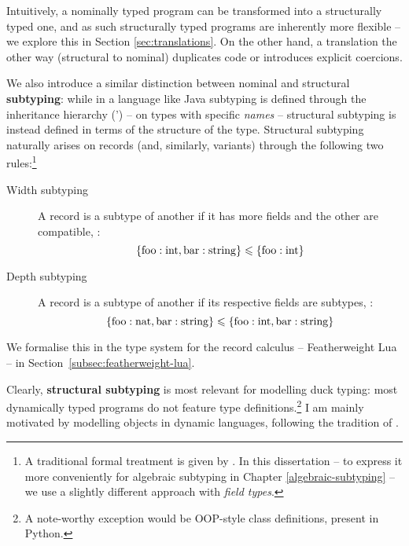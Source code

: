 Intuitively, a nominally typed program can be transformed into a structurally typed one, and as such structurally typed programs are inherently more flexible -- we explore this in Section \ref{sec:translations}. On the other hand, a translation the other way (structural to nominal) duplicates code or introduces explicit coercions.

We also introduce a similar distinction between nominal and structural \textbf{subtyping}: while in a language like Java subtyping is defined through the inheritance hierarchy (') -- on types with specific \emph{names} -- structural subtyping is instead defined in terms of the structure of the type. Structural subtyping naturally arises on records (and, similarly, variants) through the following two rules:\footnote{A traditional formal treatment is given by \textcite{tapl}. In this dissertation -- to express it more conveniently for algebraic subtyping in Chapter \ref{algebraic-subtyping} -- we use a slightly different approach with \emph{field types}.}
\begin{description}
    \item[Width subtyping] A record is a subtype of another if it has more fields and the other are compatible, \eg{}: $$ \{ \mathrm{foo} : \mathrm{int}, \mathrm{bar} : \mathrm{string} \} \leqslant \{ \mathrm{foo} : \mathrm{int} \} $$
    \item[Depth subtyping] A record is a subtype of another if its respective fields are subtypes, \eg{}:
    $$ \{ \mathrm{foo}: \mathrm{nat}, \mathrm{bar}: \mathrm{string} \} \leqslant \{ \mathrm{foo}: \mathrm{int}, \mathrm{bar}: \mathrm{string} \} $$
\end{description}

We formalise this in the type system for the record calculus -- Featherweight Lua -- in Section~\ref{subsec:featherweight-lua}.

Clearly, \textbf{structural subtyping} is most relevant for modelling duck typing: most dynamically typed programs do not feature type definitions.\footnote{A note-worthy exception would be OOP-style class definitions, present in \eg{} Python.} I am mainly motivated by modelling objects in dynamic languages, following the tradition of \textcite{cardelli-multiple-inheritance}.

